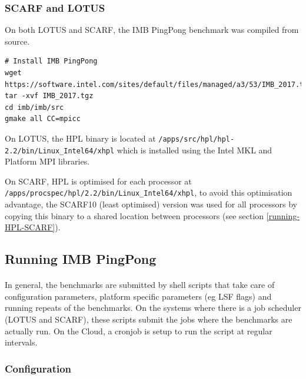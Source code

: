 \documentclass{article}
\newenvironment{code}{\captionsetup{type=listing}}{}
\begin{document}
        \subsubsection{SCARF and LOTUS}
        On both LOTUS and SCARF, the IMB PingPong benchmark was compiled from source.

            \begin{code}
            \label{code:builds-jasmin_scarf-buildimb-sh}
            \begin{verbatim}
# Install IMB PingPong
wget https://software.intel.com/sites/default/files/managed/a3/53/IMB_2017.tgz
tar -xvf IMB_2017.tgz
cd imb/imb/src
gmake all CC=mpicc
            \end{verbatim}
            \end{code}


        On LOTUS, the HPL binary is located at \verb|/apps/src/hpl/hpl-2.2/bin/Linux_Intel64/xhpl| which is installed using the Intel MKL and Platform MPI libraries.

        On SCARF, HPL is optimised for each processor at \verb|/apps/procspec/hpl/2.2/bin/Linux_Intel64/xhpl|, to avoid this optimisation advantage, the SCARF10 (least optimised) version was used for all processors by copying this binary to a shared location between processors (see section \ref{running-HPL-SCARF}).




    \subsection{Running IMB PingPong}

        \paragraph{}
        In general, the benchmarks are submitted by shell scripts that take care of configuration parameters, platform specific parameters (eg LSF flags) and running repeats of the benchmarks. On the systems where there is a job scheduler (LOTUS and SCARF), these scripts submit the jobs where the benchmarks are actually run. On the Cloud, a cronjob is setup to run the script at regular intervals.

        \subsubsection{Configuration}
\end{document}
